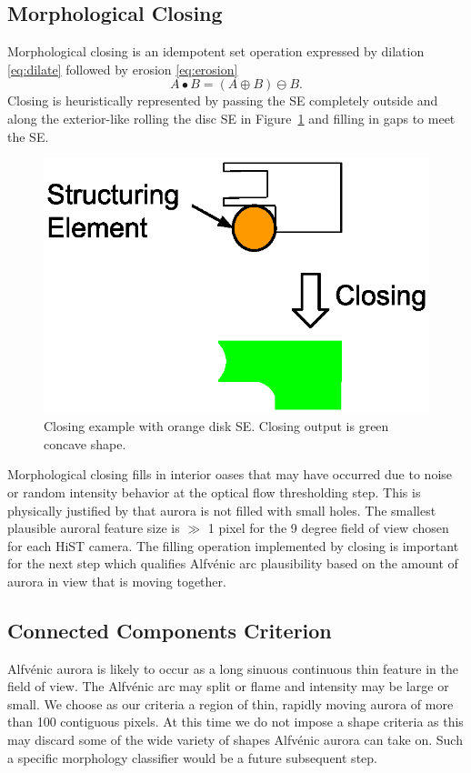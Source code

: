 \subsection{Morphological Closing}\label{sec:close}
Morphological closing is an idempotent set operation expressed by dilation \eqref{eq:dilate} followed by erosion \eqref{eq:erosion}
\begin{equation}\label{eq:close}
A \bullet B = \left(A \oplus B \right) \ominus B.
\end{equation}
Closing is heuristically represented by passing the SE completely outside and along the exterior-like rolling the disc SE in Figure~\ref{fig:closing} and filling in gaps to meet the SE.
\begin{figure}\centering
\includegraphics[width=0.7\linewidth,trim=50 0 50 0,clip]{gfx/close}
\caption{Closing example with orange disk SE. Closing output is green concave shape.}\label{fig:closing}
\end{figure}
Morphological closing fills in interior oases that may have occurred due to noise or random intensity behavior at the optical flow thresholding step.
This is physically justified by that aurora is not filled with small holes.
The smallest plausible auroral feature size is $\gg$ 1 pixel for the 9 degree field of view chosen for each HiST camera.
The filling operation implemented by closing is important for the next step which qualifies Alfvénic arc plausibility based on the amount of aurora in view that is moving together.

\subsection{Connected Components Criterion}\label{sec:blob}
Alfvénic aurora is likely to occur as a long sinuous continuous thin feature in the field of view.
The Alfvénic arc may split or flame and intensity may be large or small.
We choose as our criteria a region of thin, rapidly moving aurora of more than 100 contiguous pixels.
At this time we do not impose a shape criteria as this may discard some of the wide variety of shapes Alfvénic aurora can take on.
Such a specific morphology classifier would be a future subsequent step.

